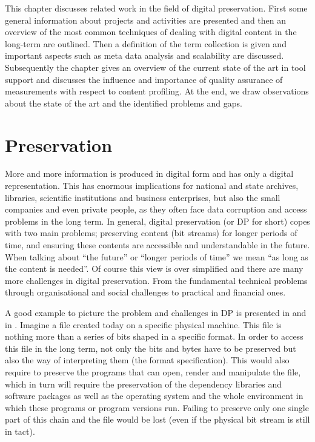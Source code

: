 This chapter discusses related work in the field of digital preservation.
First some general information about projects and activities are presented and then an overview of the most common techniques of dealing with digital content in the long-term are outlined.
Then a definition of the term collection is given and important aspects such as meta data analysis and scalability are discussed.
Subsequently the chapter gives an overview of the current state of the art in tool support and discusses the influence and importance of quality assurance of measurements with respect to content profiling.
At the end, we draw observations about the state of the art and the identified problems and gaps.

\section{Preservation}
More and more information is produced in digital form and has only a digital representation.
This has enormous implications for national and state archives, libraries, scientific institutions and business enterprises, but also the small companies and even private people, as they often face data corruption and access problems in the long term.
In general, digital preservation (or DP for short) copes with two main problems; preserving content (bit streams) for longer periods of time, and ensuring these contents are accessible and understandable in the future.
When talking about ``the future'' or ``longer periods of time'' we mean ``as long as the content is needed''.
Of course this view is over simplified and there are many more challenges in digital preservation.
From the fundamental technical problems through organisational and social challenges to practical and financial ones.

A good example to picture the problem and challenges in DP is presented in \cite{Lorie:2001:LTP:379437.379726} and in \cite{Rauber:2009:dpchallenges}. Imagine a file created today on a specific physical machine. This file is nothing more than a series of bits shaped in a specific format. In order to access this file in the long term, not only the bits and bytes have to be preserved but also the way of interpreting them (the format specification). This would also require to preserve the programs that can open, render and manipulate the file, which in turn will require the preservation of the dependency libraries and software packages as well as the operating system and the whole environment in which these programs or program versions run. Failing to preserve only one single part of this chain and the file would be lost (even if the physical bit stream is still in tact).

